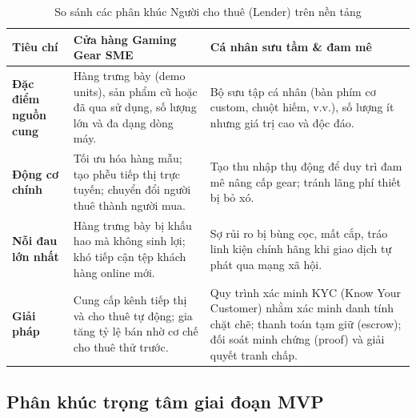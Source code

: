 \begin{table}[H]
    \centering
    \caption{So sánh các phân khúc Người cho thuê (Lender) trên nền tảng}
    \label{tab:lender-icp}
    \small
    \begin{tabular}{p{3.5cm}p{5.5cm}p{5.5cm}}
        \toprule
        \textbf{Tiêu chí} & \textbf{Cửa hàng Gaming Gear SME} & \textbf{Cá nhân sưu tầm \& đam mê} \\
        \midrule
        \textbf{Đặc điểm nguồn cung} & Hàng trưng bày (demo units), sản phẩm cũ hoặc đã qua sử dụng, số lượng lớn và đa dạng dòng máy. & Bộ sưu tập cá nhân (bàn phím cơ custom, chuột hiếm, v.v.), số lượng ít nhưng giá trị cao và độc đáo. \\
        \textbf{Động cơ chính} & Tối ưu hóa hàng mẫu; tạo phễu tiếp thị trực tuyến; chuyển đổi người thuê thành người mua. & Tạo thu nhập thụ động để duy trì đam mê nâng cấp gear; tránh lãng phí thiết bị bỏ xó. \\
        \textbf{Nỗi đau lớn nhất} & Hàng trưng bày bị khấu hao mà không sinh lợi; khó tiếp cận tệp khách hàng online mới. & Sợ rủi ro bị bùng cọc, mất cắp, tráo linh kiện chính hãng khi giao dịch tự phát qua mạng xã hội. \\
        \textbf{Giải pháp \projectname{}} & Cung cấp kênh tiếp thị và cho thuê tự động; gia tăng tỷ lệ bán nhờ cơ chế cho thuê thử trước. & Quy trình xác minh KYC (Know Your Customer) nhằm xác minh danh tính chặt chẽ; thanh toán tạm giữ (escrow); đối soát minh chứng (proof) và giải quyết tranh chấp. \\
        \bottomrule
    \end{tabular}
\end{table}

\subsection{Phân khúc trọng tâm giai đoạn MVP}

